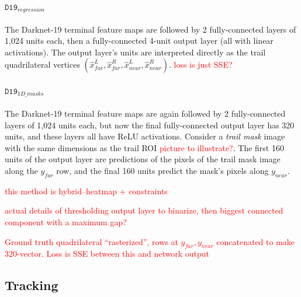\documentclass[letterpaper, 10 pt, conference]{ieeeconf}  %
\newcommand{\comment}[1]{\textcolor{red}{#1}}
\newcommand{\TrailOneDMaskNet}{\mathtt{D19}_{\mathit{1D\_masks}}}
\newcommand{\TrailRegressionNet}{\mathtt{D19}_{\mathit{regression}}}
\newcommand{\TrailNearLine}{y_{near}}
\newcommand{\TrailFarLine}{y_{far}}
\begin{document}
\paragraph{$\TrailRegressionNet$} The Darknet-19 terminal feature maps are followed by 2 fully-connected
layers of 1,024 units each, then a fully-connected 4-unit output layer (all with linear activations).
The output layer's units are interpreted directly as the trail quadrilateral vertices
$(\hat{x}^{L}_{far}, \hat{x}^{R}_{far}, \hat{x}^{L}_{near}, \hat{x}^{R}_{near})$.  \comment{loss is just SSE?}

\paragraph{$\TrailOneDMaskNet$} The Darknet-19 terminal feature maps are again followed by 2 fully-connected
layers of 1,024 units each, but now the final fully-connected output
layer has 320 units, and these layers all have ReLU activations.
Consider a \textit{trail mask} image with the same dimensions as the
trail ROI \comment{picture to illustrate?}.  The first 160 units of
the output layer are predictions of the pixels of the trail mask image
along the $\TrailFarLine$ row, and the final 160 units predict the
mask's pixels along $\TrailNearLine$.

\comment{this method is hybrid--heatmap + constraints}

\comment{actual details of thresholding output layer to binarize, then biggest connected component
  with a maximum gap?}

\comment{Ground truth quadrilateral ``rasterized'', rows at $\TrailFarLine, \TrailNearLine$ concatenated to make 320-vector.  Loss is SSE between this and network output}








\subsection{Tracking}
\end{document}
